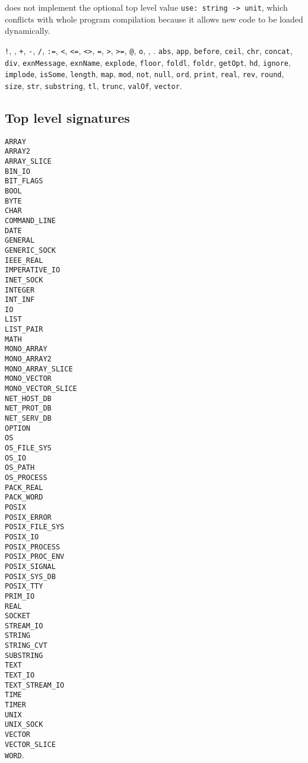 {\mlton does not implement the optional top level value
\verb+use: string -> unit+, which conflicts with whole
program compilation because it allows new code to be loaded
dynamically.

{\tt !},
{\tt *},
{\tt +},
{\tt -},
{\tt /},
{\tt :=},
{\tt <},
{\tt <=},
{\tt <>},
{\tt =},
{\tt >},
{\tt >=},
{\tt @},
{\tt o},
{\tt {}},
{\tt {}}.
{\tt abs},
{\tt app},
{\tt before},
{\tt ceil},
{\tt chr},
{\tt concat},
{\tt div},
{\tt exnMessage},
{\tt exnName},
{\tt explode},
{\tt floor},
{\tt foldl},
{\tt foldr},
{\tt getOpt},
{\tt hd},
{\tt ignore},
{\tt implode},
{\tt isSome},
{\tt length},
{\tt map},
{\tt mod},
{\tt not},
{\tt null},
{\tt ord},
{\tt print},
{\tt real},
{\tt rev},
{\tt round},
{\tt size},
{\tt str},
{\tt substring},
{\tt tl},
{\tt trunc},
{\tt valOf},
{\tt vector}.

\newcommand{\signature}[1]{{\tt #1}\\}
\subsection{Top level signatures}
\signature{ARRAY}
\signature{ARRAY2}
\signature{ARRAY\_SLICE}
\signature{BIN\_IO}
\signature{BIT\_FLAGS}
\signature{BOOL}
\signature{BYTE}
\signature{CHAR}
\signature{COMMAND\_LINE}
\signature{DATE}
\signature{GENERAL}
\signature{GENERIC\_SOCK}
\signature{IEEE\_REAL}
\signature{IMPERATIVE\_IO}
\signature{INET\_SOCK}
\signature{INTEGER}
\signature{INT\_INF}
\signature{IO}
\signature{LIST}
\signature{LIST\_PAIR}
\signature{MATH}
\signature{MONO\_ARRAY}
\signature{MONO\_ARRAY2}
\signature{MONO\_ARRAY\_SLICE}
\signature{MONO\_VECTOR}
\signature{MONO\_VECTOR\_SLICE}
\signature{NET\_HOST\_DB}
\signature{NET\_PROT\_DB}
\signature{NET\_SERV\_DB}
\signature{OPTION}
\signature{OS}
\signature{OS\_FILE\_SYS}
\signature{OS\_IO}
\signature{OS\_PATH}
\signature{OS\_PROCESS}
\signature{PACK\_REAL}
\signature{PACK\_WORD}
\signature{POSIX}
\signature{POSIX\_ERROR}
\signature{POSIX\_FILE\_SYS}
\signature{POSIX\_IO}
\signature{POSIX\_PROCESS}
\signature{POSIX\_PROC\_ENV}
\signature{POSIX\_SIGNAL}
\signature{POSIX\_SYS\_DB}
\signature{POSIX\_TTY}
\signature{PRIM\_IO}
\signature{REAL}
\signature{SOCKET}
\signature{STREAM\_IO}
\signature{STRING}
\signature{STRING\_CVT}
\signature{SUBSTRING}
\signature{TEXT}
\signature{TEXT\_IO}
\signature{TEXT\_STREAM\_IO}
\signature{TIME}
\signature{TIMER}
\signature{UNIX}
\signature{UNIX\_SOCK}
\signature{VECTOR}
\signature{VECTOR\_SLICE}
{\tt WORD}.

\newcommand{\fullmodule}[2]{{\tt #1: #2}\\ }
}
